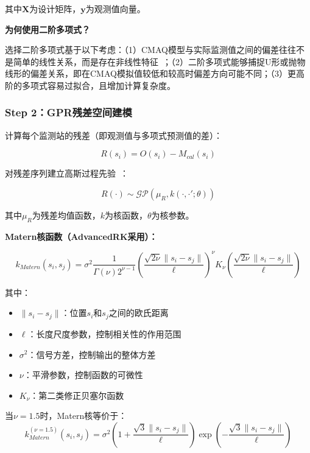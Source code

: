 \documentclass[UTF8, a4paper, 12pt]{article}
\begin{document}
其中$\mathbf{X}$为设计矩阵，$\mathbf{y}$为观测值向量。

\textbf{为何使用二阶多项式？}

选择二阶多项式基于以下考虑：（1）CMAQ模型与实际监测值之间的偏差往往不是简单的线性关系，而是存在非线性特征~\cite{zheng2020kriging}；（2）二阶多项式能够捕捉U形或抛物线形的偏差关系，即在CMAQ模拟值较低和较高时偏差方向可能不同；（3）更高阶的多项式容易过拟合，且增加计算复杂度。

\subsubsection{Step 2：GPR残差空间建模}

计算每个监测站的残差（即观测值与多项式预测值的差）：

\begin{equation}
R(s_i) = O(s_i) - M_{cal}(s_i)
\end{equation}

对残差序列建立高斯过程先验~\cite{rasmussen2006gaussian}：

\begin{equation}
R(\cdot) \sim \mathcal{GP}(\mu_R, k(\cdot, \cdot'; \theta))
\end{equation}

其中$\mu_R$为残差均值函数，$k$为核函数，$\theta$为核参数。

\textbf{Matern核函数（AdvancedRK采用）：}

\begin{equation}
k_{Matern}(s_i, s_j) = \sigma^2 \frac{1}{\Gamma(\nu)2^{\nu-1}} \left(\frac{\sqrt{2\nu}\|s_i - s_j\|}{\ell}\right)^\nu K_\nu\left(\frac{\sqrt{2\nu}\|s_i - s_j\|}{\ell}\right)
\end{equation}

其中：
\begin{itemize}
    \item $\|s_i - s_j\|$：位置$s_i$和$s_j$之间的欧氏距离
    \item $\ell$：长度尺度参数，控制相关性的作用范围
    \item $\sigma^2$：信号方差，控制输出的整体方差
    \item $\nu$：平滑参数，控制函数的可微性
    \item $K_\nu$：第二类修正贝塞尔函数
\end{itemize}

当$\nu=1.5$时，Matern核等价于：
\begin{equation}
k_{Matern}^{(\nu=1.5)}(s_i, s_j) = \sigma^2 \left(1 + \frac{\sqrt{3}\|s_i - s_j\|}{\ell}\right) \exp\left(-\frac{\sqrt{3}\|s_i - s_j\|}{\ell}\right)
\end{equation}
\end{document}
